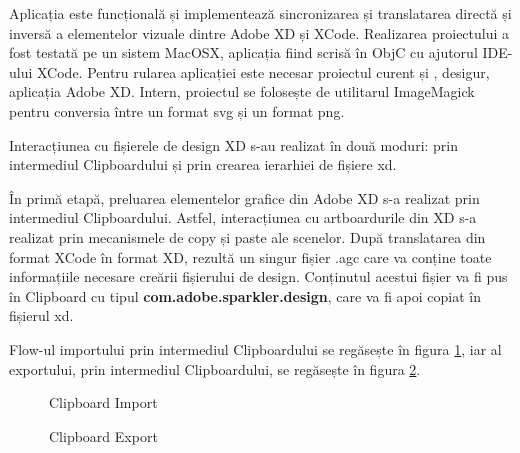 Aplicația este funcțională și implementează sincronizarea și translatarea directă și inversă a elementelor vizuale dintre Adobe XD și XCode. 
Realizarea proiectului a fost testată pe un sistem MacOSX, aplicația fiind scrisă în ObjC cu ajutorul IDE-ului XCode. Pentru rularea aplicației este necesar proiectul curent \cite{repoGit} și , desigur, aplicația Adobe XD.
Intern, proiectul se folosește de utilitarul ImageMagick pentru conversia între un format svg și un format png.

Interacțiunea cu fișierele de design XD s-au realizat în două moduri: prin intermediul Clipboardului și prin crearea ierarhiei de fișiere xd.

În primă etapă, preluarea elementelor grafice din Adobe XD s-a realizat prin intermediul Clipboardului. Astfel, interacțiunea cu artboardurile din XD s-a realizat prin mecanismele de copy și paste ale scenelor.
După translatarea din format XCode în format XD, rezultă un singur fișier .agc care va conține toate informațiile necesare creării fișierului de design. Conținutul acestui fișier va fi pus în Clipboard cu tipul \textbf{com.adobe.sparkler.design}, care va fi apoi copiat în fișierul xd.

Flow-ul importului prin intermediul Clipboardului se regăsește în figura \ref{fig:Clipboard Import}, iar al exportului, prin intermediul Clipboardului, se regăsește în figura \ref{fig:Clipboard Export}.


\begin{figure}[!htbp]
\centering
{}
\caption{Clipboard Import} \label{fig:Clipboard Import}
\end{figure}

\begin{figure}[!htbp]
\centering
{}
\caption{Clipboard Export} \label{fig:Clipboard Export}
\end{figure}


